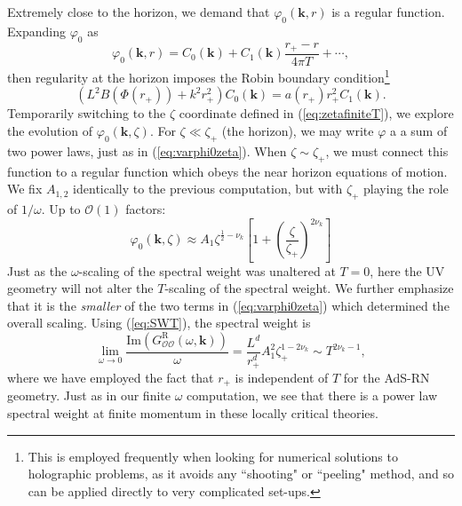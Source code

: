 \documentclass[10pt, oneside]{book}
\begin{document}
\begin{doublespace}
Extremely close to the horizon,  we demand that $\varphi_0(\mathbf{k},r)$ is a regular function.   Expanding $\varphi_0$ as \begin{equation}
\varphi_0(\mathbf{k},r) = C_0(\mathbf{k}) + C_1(\mathbf{k}) \frac{r_+-r}{4\pi T} + \cdots,
\end{equation}
then regularity at the horizon imposes the Robin boundary condition\footnote{This is employed frequently when looking for numerical solutions to holographic problems, as it avoids any ``shooting" or ``peeling" method, and so can be applied directly to very complicated set-ups.} \begin{equation}
\left(L^2 B(\Phi(r_+)) + k^2 r_+^2 \right) C_0(\mathbf{k}) = a(r_+)r_+^2 C_1(\mathbf{k}).  \label{eq:RobinBC}
\end{equation}
Temporarily switching to the $\zeta$ coordinate defined in (\ref{eq:zetafiniteT}), we explore the evolution of $\varphi_0(\mathbf{k},\zeta)$.    For $\zeta \ll \zeta_+$ (the horizon), we may write $\varphi$ a a sum of two power laws, just as in (\ref{eq:varphi0zeta}).  
When $\zeta \sim \zeta_+$, we must connect this function to a regular function which obeys the near horizon equations of motion.   We fix $A_{1,2}$ identically to the previous computation, but with $\zeta_+$ playing the role of $1/\omega$.  Up to $\mathcal{O}(1)$ factors: \begin{equation}
\varphi_0(\mathbf{k},\zeta) \approx A_1 \zeta^{\frac{1}{2}-\nu_k}  \left[1 + \left(\frac{\zeta}{\zeta_+}\right)^{2\nu_k}\right]  \label{eq:varphi0zeta2}
\end{equation}
Just as the $\omega$-scaling of the spectral weight was unaltered at $T=0$, here the UV geometry will not alter the $T$-scaling of the spectral weight. 
We further emphasize that it is the \emph{smaller} of the two terms in (\ref{eq:varphi0zeta}) which determined the overall scaling.   Using (\ref{eq:SWT}), the spectral weight is \begin{equation}
\lim_{\omega \rightarrow 0} \frac{\mathrm{Im}\left(G^{\mathrm{R}}_{\mathcal{OO}}(\omega,\mathbf{k})\right)}{\omega} = \frac{L^d}{r_+^d} A_1^2 \zeta_+^{1-2\nu_k} \sim T^{2\nu_k-1},  \label{eq:zinfSW}
\end{equation}
where we have employed the fact that $r_+$ is independent of $T$ for the AdS-RN geometry.   Just as in our finite $\omega$ computation, we see that there is a power law spectral weight at finite momentum in these locally critical theories.


\end{doublespace}
\end{document}
